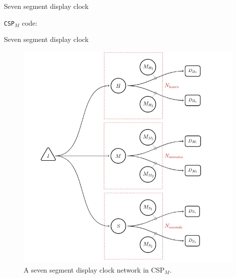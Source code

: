 \documentclass[13pt]{beamer}
\newcommand{\cspm}{CSP$_M$}
\begin{document}
%
\begin{frame}{Seven segment display clock}
 \begin{block}{}
  \texttt{\cspm{}} code:
    \vspace{3mm}

     \scalebox{0.7}{\usebox{\cspmexample}}
 \end{block}
\end{frame}
%
\begin{frame}{Seven segment display clock}
     \begin{figure}[!ht]
          \centering
          \includegraphics[scale=0.295]{cspm_figure.jpg}
          \caption{A seven segment display clock network in \cspm{}.}
          \label{fig:cspm-network}
     \end{figure}
\end{frame}
\end{document}

